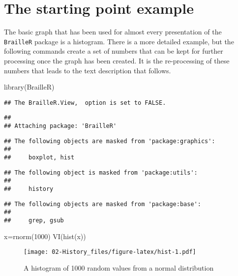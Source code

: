 \documentclass[
]{book}
\newenvironment{Shaded}{\begin{snugshade}}{\end{snugshade}}
\newcommand{\DecValTok}[1]{\textcolor[rgb]{0.00,0.00,0.81}{#1}}
\newcommand{\FunctionTok}[1]{\textcolor[rgb]{0.00,0.00,0.00}{#1}}
\newcommand{\NormalTok}[1]{#1}
\newcommand{\OtherTok}[1]{\textcolor[rgb]{0.56,0.35,0.01}{#1}}
\begin{document}
\hypertarget{the-starting-point-example}{%
\section{The starting point example}\label{the-starting-point-example}}

The basic graph that has been used for almost every presentation of the \texttt{BrailleR} package is a histogram. There is a more detailed example, but the following commands create a set of numbers that can be kept for further processing once the graph has been created. It is the re-processing of these numbers that leads to the text description that follows.

\begin{Shaded}
\begin{Highlighting}[]
\FunctionTok{library}\NormalTok{(BrailleR)}
\end{Highlighting}
\end{Shaded}

\begin{verbatim}
## The BrailleR.View,  option is set to FALSE.
\end{verbatim}

\begin{verbatim}
## 
## Attaching package: 'BrailleR'
\end{verbatim}

\begin{verbatim}
## The following objects are masked from 'package:graphics':
## 
##     boxplot, hist
\end{verbatim}

\begin{verbatim}
## The following object is masked from 'package:utils':
## 
##     history
\end{verbatim}

\begin{verbatim}
## The following objects are masked from 'package:base':
## 
##     grep, gsub
\end{verbatim}

\begin{Shaded}
\begin{Highlighting}[]
\NormalTok{x}\OtherTok{=}\FunctionTok{rnorm}\NormalTok{(}\DecValTok{1000}\NormalTok{)}
\FunctionTok{VI}\NormalTok{(}\FunctionTok{hist}\NormalTok{(x))}
\end{Highlighting}
\end{Shaded}

\begin{figure}
\centering
\texttt{[image: 02-History\_files/figure-latex/hist-1.pdf]}
\caption{\label{fig:hist}A histogram of 1000 random values from a normal distribution}
\end{figure}
\end{document}
